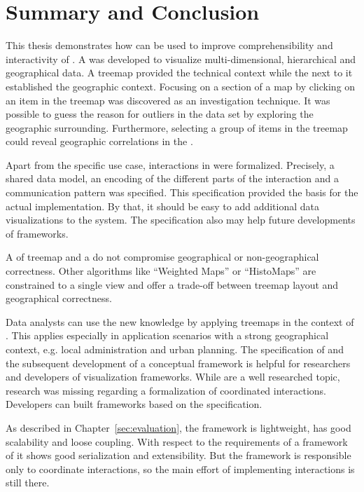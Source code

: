 \chapter{Summary and Conclusion}\label{sec:conclusion}

This thesis demonstrates how \cmvs{} can be used to improve comprehensibility and interactivity of \tmaps{}.
A \cmv{} was developed to visualize multi-dimensional, hierarchical and geographical data.
A treemap provided the technical context while the \gv{} next to it established the geographic context.
Focusing on a section of a map by clicking on an item in the treemap was discovered as an investigation technique.
It was possible to guess the reason for outliers in the data set by exploring the geographic surrounding.
Furthermore, selecting a group of items in the treemap could reveal geographic correlations in the \gv{}.

Apart from the specific use case, interactions in \cmvs{} were formalized.
Precisely, a shared data model, an encoding of the different parts of the interaction and a communication pattern was specified.
This specification provided the basis for the actual implementation.
By that, it should be easy to add additional data visualizations to the system.
The specification also may help future developments of \cmv{} frameworks.

A \cmv{} of treemap and a \gv{} do not compromise geographical or non-geographical correctness.
Other algorithms like ``Weighted Maps'' or ``HistoMaps'' are constrained to a single view and offer a trade-off between treemap layout and geographical correctness.

Data analysts can use the new knowledge by applying treemaps in the context of \dss{}.
This applies especially in application scenarios with a strong geographical context, e.g. local administration and urban planning.
The specification of \cmvs{} and the subsequent development of a conceptual framework is helpful for researchers and developers of visualization frameworks.
While \cmvs{} are a well researched topic, research was missing regarding a formalization of coordinated interactions.
Developers can built frameworks based on the specification.

As described in Chapter~\ref{sec:evaluation}, the framework is lightweight, has good scalability and loose coupling.
With respect to the requirements of a framework of \cmvs{} it shows good serialization and extensibility.
But the framework is responsible only to coordinate interactions, so the main effort of implementing interactions is still there.

